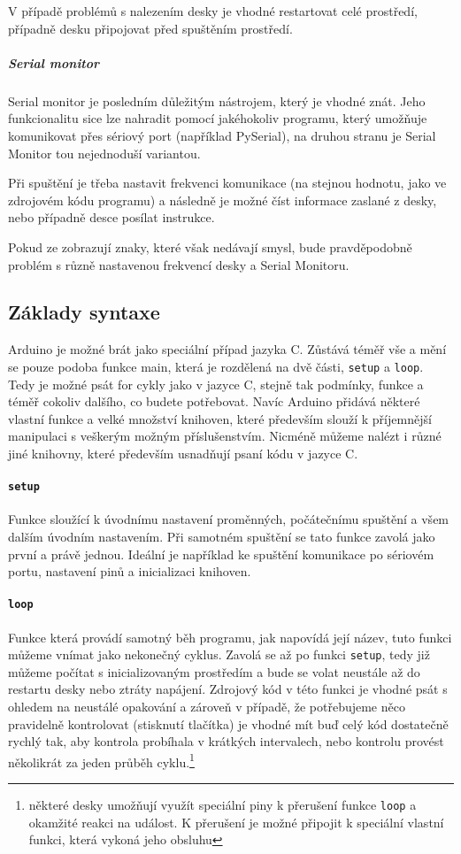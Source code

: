 \documentclass[12pt,titlepage]{article}
\begin{document}
			V případě problémů s nalezením desky je vhodné restartovat celé prostředí, případně desku připojovat před spuštěním prostředí.

		\subparagraph{Serial monitor}
			Serial monitor je posledním důležitým nástrojem, který je vhodné znát. Jeho funkcionalitu sice lze nahradit pomocí jakéhokoliv programu, který umožňuje komunikovat přes sériový port (například PySerial), na druhou stranu je Serial Monitor tou nejednoduší variantou.

			Při spuštění je třeba nastavit frekvenci komunikace (na stejnou hodnotu, jako ve zdrojovém kódu programu) a následně je možné číst informace zaslané z desky, nebo případně desce posílat instrukce.

			Pokud ze zobrazují znaky, které však nedávají smysl, bude pravděpodobně problém s různě nastavenou frekvencí desky a Serial Monitoru.


	\subsection{Základy syntaxe}
			Arduino je možné brát jako speciální případ jazyka C. Zůstává téměř vše a mění se pouze podoba funkce main, která je rozdělená na dvě části, \texttt{setup} a \texttt{loop}.
			Tedy je možné psát for cykly jako v jazyce C, stejně tak podmínky, funkce a téměř cokoliv dalšího, co budete potřebovat. Navíc Arduino přidává některé vlastní funkce a velké množství knihoven, které především slouží k příjemnější manipulaci s veškerým možným příslušenstvím. Nicméně můžeme nalézt i různé jiné knihovny, které především usnadňují psaní kódu v jazyce C.

		\paragraph{\textbf{\texttt{setup}}}
			Funkce sloužící k úvodnímu nastavení proměnných, počátečnímu spuštění a všem dalším úvodním nastavením. Při samotném spuštění se tato funkce zavolá jako první a právě jednou. Ideální je například ke spuštění komunikace po sériovém portu, nastavení pinů a inicializaci knihoven.

		\paragraph{\textbf{\texttt{loop}}}
			Funkce která provádí samotný běh programu, jak napovídá její název, tuto funkci můžeme vnímat jako nekonečný cyklus. Zavolá se až po funkci \texttt{setup}, tedy již můžeme počítat s inicializovaným prostředím a bude se volat neustále až do restartu desky nebo ztráty napájení. Zdrojový kód v této funkci je vhodné psát s ohledem na neustálé opakování a zároveň v případě, že potřebujeme něco pravidelně kontrolovat (stisknutí tlačítka) je vhodné mít buď celý kód dostatečně rychlý tak, aby kontrola probíhala v krátkých intervalech, nebo kontrolu provést několikrát za jeden průběh cyklu.\footnote{některé desky umožňují využít speciální piny k přerušení funkce \texttt{loop} a okamžité reakci na událost. K přerušení je možné připojit k speciální vlastní funkci, která vykoná jeho obsluhu}
\end{document}
